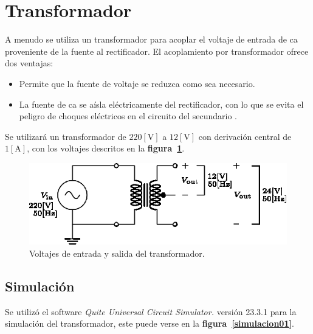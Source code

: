 \section{Transformador}
A menudo se utiliza un transformador para acoplar el voltaje de entrada de ca
proveniente de la fuente al rectificador. El acoplamiento por transformador
ofrece dos ventajas:

\begin{itemize}
    \item Permite que la fuente de voltaje se reduzca como sea necesario.
    \item La fuente de ca se aísla eléctricamente del rectificador, con lo que
        se evita el peligro de choques eléctricos en el circuito del
        secundario \cite{Floyd}.
\end{itemize}

Se utilizará un transformador de $220[\text{V}]$ a $12[\text{V}]$ con derivación
central de $1[\text{A}]$, con los voltajes descritos en la
\textbf{figura~\ref{circuito01}}.

\begin{figure}[!h]
\centering
\includegraphics[scale=1]{diagramas/01.transformador.eps}
\caption{Voltajes de entrada y salida del transformador.}
\label{circuito01}
\end{figure}

\subsection{Simulación}
Se utilizó el software \emph{Quite Universal Circuit Simulator.} versión 23.3.1
para la simulación del transformador, este puede verse en la
\textbf{figura~\ref{simulacion01}}.

